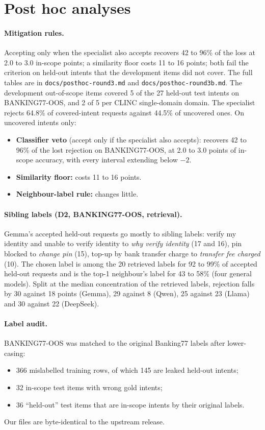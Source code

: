 \documentclass[11pt]{article}
\begin{document}
\section{Post hoc analyses}
\label{app:posthoc}

\paragraph{Mitigation rules.} Accepting only when the specialist also accepts recovers 42 to 96\% of the loss at 2.0 to 3.0 in-scope points; a similarity floor costs 11 to 16 points; both fail the criterion on held-out intents that the development items did not cover. The full tables are in \texttt{docs/posthoc-round3.md} and \texttt{docs/posthoc-round3b.md}. The development out-of-scope items covered 5 of the 27 held-out test intents on BANKING77-OOS, and 2 of 5 per CLINC single-domain domain. The specialist rejects 64.8\% of covered-intent requests against 44.5\% of uncovered ones. On uncovered intents only:
\begin{itemize}
  \item \textbf{Classifier veto} (accept only if the specialist also accepts): recovers 42 to 96\% of the lost rejection on BANKING77-OOS, at 2.0 to 3.0 points of in-scope accuracy, with every interval extending below $-2$.
  \item \textbf{Similarity floor:} costs 11 to 16 points.
  \item \textbf{Neighbour-label rule:} changes little.
\end{itemize}

\paragraph{Sibling labels (D2, BANKING77-OOS, retrieval).} Gemma's accepted held-out requests go mostly to sibling labels: verify my identity and unable to verify identity to \emph{why verify identity} (17 and 16), pin blocked to \emph{change pin} (15), top-up by bank transfer charge to \emph{transfer fee charged} (10). The chosen label is among the 20 retrieved labels for 92 to 99\% of accepted held-out requests and is the top-1 neighbour's label for 43 to 58\% (four general models). Split at the median concentration of the retrieved labels, rejection falls by 30 against 18 points (Gemma), 29 against 8 (Qwen), 25 against 23 (Llama) and 30 against 22 (DeepSeek).

\paragraph{Label audit.} BANKING77-OOS was matched to the original Banking77 labels after lower-casing:
\begin{itemize}
  \item 366 mislabelled training rows, of which 145 are leaked held-out intents;
  \item 32 in-scope test items with wrong gold intents;
  \item 36 ``held-out'' test items that are in-scope intents by their original labels.
\end{itemize}
Our files are byte-identical to the upstream release.
\end{document}
